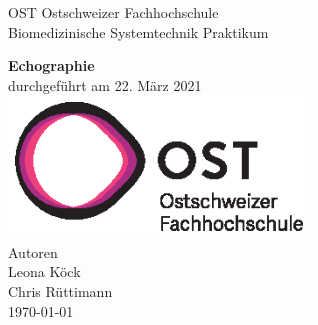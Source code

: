 \documentclass[11pt]{scrartcl}
\begin{document}
    \begin{titlepage}
        \begin{center}
        {\LARGE OST Ostschweizer Fachhochschule}
            \\[1.5cm]
            \linespread{1.2}\large { Biomedizinische Systemtechnik Praktikum }

            \huge{\bfseries Echographie}
            \\%
            \large{durchgeführt am 22. März 2021}
            \\[1.5cm]
           \includegraphics[width=8cm]{../images/ost_logo.eps}
           \\[1cm]
            {\small{Autoren}}\\
            {\Large{Leona Köck}}\\
            {\Large{Chris Rüttimann}}
            \\[1cm]

            \vspace*{\fill}
            \large{\today}
        \end{center}

    \end{titlepage}

    \addtocounter{section}{0}

    \tableofcontents
    \pagebreak



   
\end{document}
